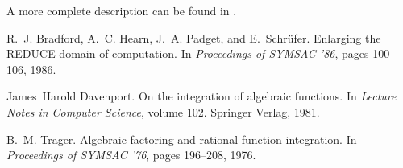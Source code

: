 A more complete description can be found in \cite{Bradford:86}.

\begin{thebibliography}{1}

R.~J. Bradford, A.~C. Hearn, J.~A. Padget, and E.~Schr{\"u}fer.
\newblock Enlarging the {REDUCE} domain of computation.
\newblock In {\em Proceedings of {SYMSAC} '86}, pages 100--106, 1986.

James~Harold Davenport.
\newblock On the integration of algebraic functions.
\newblock In {\em Lecture Notes in Computer Science}, volume 102. Springer
  Verlag, 1981.

B.~M. Trager.
\newblock Algebraic factoring and rational function integration.
\newblock In {\em Proceedings of {SYMSAC} '76}, pages 196--208, 1976.

\end{thebibliography}

